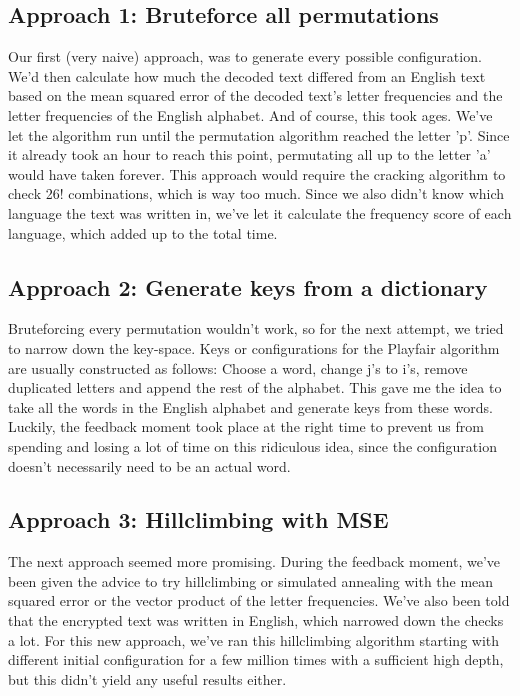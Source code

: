 \documentclass{article}
\begin{document}
\subsection{Approach 1: Bruteforce all permutations}
Our first (very naive) approach, was to generate every possible configuration. We'd then calculate how much the decoded text differed from an English text based on the mean squared error of the decoded text's letter frequencies and the letter frequencies of the English alphabet. And of course, this took ages. We've let the algorithm run until the permutation algorithm reached the letter 'p'. Since it already took an hour to reach this point, permutating all up to the letter 'a' would have taken forever. This approach would require the cracking algorithm to check 26! combinations, which is way too much. Since we also didn't know which language the text was written in, we've let it calculate the frequency score of each language, which added up to the total time.

\subsection{Approach 2: Generate keys from a dictionary}
Bruteforcing every permutation wouldn't work, so for the next attempt, we tried to narrow down the key-space. Keys or configurations for the Playfair algorithm are usually constructed as follows: Choose a word, change j's to i's, remove duplicated letters and append the rest of the alphabet. This gave me the idea to take all the words in the English alphabet and generate keys from these words. Luckily, the feedback moment took place at the right time to prevent us from spending and losing a lot of time on this ridiculous idea, since the configuration doesn't necessarily need to be an actual word.

\subsection{Approach 3: Hillclimbing with MSE}
The next approach seemed more promising. During the feedback moment, we've been given the advice to try hillclimbing or simulated annealing with the mean squared error or the vector product of the letter frequencies. We've also been told that the encrypted text was written in English, which narrowed down the checks a lot. For this new approach, we've ran this hillclimbing algorithm starting with different initial configuration for a few million times with a sufficient high depth, but this didn't yield any useful results either.
\end{document}
